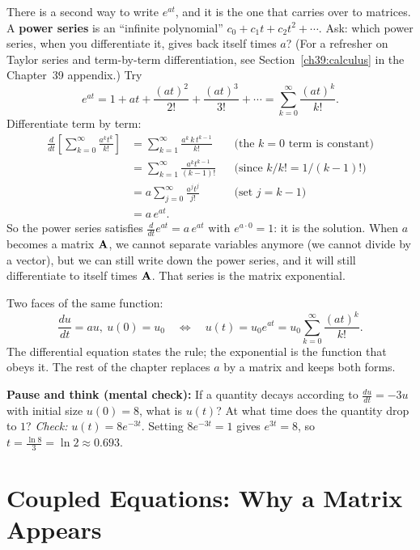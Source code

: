 There is a second way to write $e^{at}$, and it is the one that carries over to
matrices. A \textbf{power series} is an ``infinite polynomial''
$c_0 + c_1 t + c_2 t^2 + \cdots$. Ask: which power series, when you
differentiate it, gives back itself times $a$? (For a refresher on Taylor series
and term-by-term differentiation, see Section~\ref{ch39:calculus} in the
Chapter~39 appendix.) Try
\[
  e^{at} = 1 + at + \frac{(at)^2}{2!} + \frac{(at)^3}{3!} + \cdots
         = \sum_{k=0}^{\infty} \frac{(at)^k}{k!}.
\]
Differentiate term by term:
\begin{align*}
  \frac{d}{dt}\!\left[\sum_{k=0}^\infty \frac{a^k t^k}{k!}\right]
  &= \sum_{k=1}^\infty \frac{a^k\, k\, t^{k-1}}{k!}
     && \text{(the $k=0$ term is constant)}\\
  &= \sum_{k=1}^\infty \frac{a^k t^{k-1}}{(k-1)!}
     && \text{(since $k/k! = 1/(k-1)!$)}\\
  &= a\sum_{j=0}^\infty \frac{a^j t^{j}}{j!}
     && \text{(set $j=k-1$)}\\
  &= a\, e^{at}.
\end{align*}
So the power series satisfies $\frac{d}{dt}e^{at} = a\,e^{at}$ with
$e^{a\cdot 0} = 1$: it is the solution. When $a$ becomes a matrix $\mathbf{A}$, we
cannot separate variables anymore (we cannot divide by a vector), but we can
still write down the power series, and it will still differentiate to itself
times $\mathbf{A}$. That series is the matrix exponential.

\begin{focusbox}
Two faces of the same function:
\[
  \frac{du}{dt} = a u,\ u(0)=u_0
  \quad\Longleftrightarrow\quad
  u(t) = u_0 e^{at} = u_0\sum_{k=0}^\infty \frac{(at)^k}{k!}.
\]
The differential equation states the rule; the exponential is the function
that obeys it. The rest of the chapter replaces $a$ by a matrix and keeps both
forms.
\end{focusbox}

\begin{recoverybox}
\textbf{Pause and think (mental check):} If a quantity decays according to
$\frac{du}{dt} = -3u$ with initial size $u(0) = 8$, what is $u(t)$? At what time
does the quantity drop to $1$?
\emph{Check:} $u(t) = 8e^{-3t}$. Setting $8e^{-3t} = 1$ gives $e^{3t} = 8$, so
$t = \frac{\ln 8}{3} = \ln 2 \approx 0.693$.
\end{recoverybox}

\section{Coupled Equations: Why a Matrix Appears}
\label{ch25:coupled}

